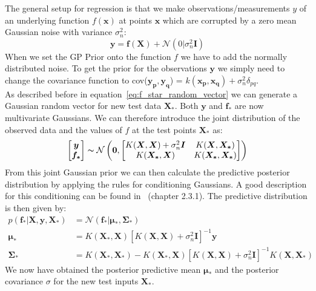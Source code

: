\documentclass{article}
\begin{document}
The general setup for regression is that we make observations/measurements $y$ of an underlying function $f(\bm{x})$ at points $\bm{x}$ which are corrupted by a zero mean Gaussian noise with variance $\sigma_n^2$:
\begin{equation}
    \bm{y} = \bm{f}(\bm{X}) + \mathcal{N}(0|\sigma_n^2 \bm{I})
\end{equation}
When we set the GP Prior onto the function $f$ we have to add the normally distributed noise. To get the prior for the observations $\bm{y}$ we simply need to change the covariance function to cov($\bm{y_p,y_q}$) = $k(\bm{x_p,x_q}) + \sigma_n^2\delta_{pq}$.\\
As described before in equation~\ref{eq:f_star_random_vector} we can generate a Gaussian random vector for new test data $\bm{X_*}$. Both $\bm{y}$ and $\bm{f_*}$ are now multivariate Gaussians. We can therefore introduce the joint distribution of the observed data and the values of $f$ at the test points $\bm{X_*}$ as:
\begin{equation}
    \label{eq:joint_f,X_*}
    \begin{aligned}
        \begin{bmatrix}
            \bm{y} \\
            \bm{f_*}
        \end{bmatrix}
        \thicksim  \mathcal{N}\left(\bm{0},
        \begin{bmatrix}
            K(\bm{X},\bm{X}) + \sigma_n^2 \bm{I} & K(\bm{X},\bm{X_*})   \\
            K(\bm{X_*},\bm{X})                   & K(\bm{X_*},\bm{X_*})
        \end{bmatrix}
        \right)
    \end{aligned}
\end{equation}
From this joint Gaussian prior we can then calculate the predictive posterior distribution by applying the rules for conditioning Gaussians. A good description for this conditioning can be found in~\cite{bishop} (chapter 2.3.1). The predictive distribution is then given by:
\begin{equation}
    \begin{aligned}
        \label{eq:general_kernel}
        p(\bm{f_*}|\bm{X},\bm{y},\bm{X_*}) & = \mathcal{N}(\bm{f_*|\bm{\mu_*}},\bm{\Sigma_*})                                                           \\
        \bm{\mu_*}                         & =  K(\bm{X_*},\bm{X}){[K(\bm{X},\bm{X}) + \sigma_n^2 \bm{I}]}^{-1} \bm{y}                                  \\
        \bm{\Sigma_*}                      & = K(\bm{X_*},\bm{X_*}) - K(\bm{X_*},\bm{X}){[K(\bm{X},\bm{X}) + \sigma_n^2 \bm{I}]}^{-1}K(\bm{X},\bm{X_*})
    \end{aligned}
\end{equation}
We now have obtained the posterior predictive mean $\bm{\mu_*}$ and the posterior covariance $\sigma$ for the new test inputs $\bm{X_*}$.
\end{document}
